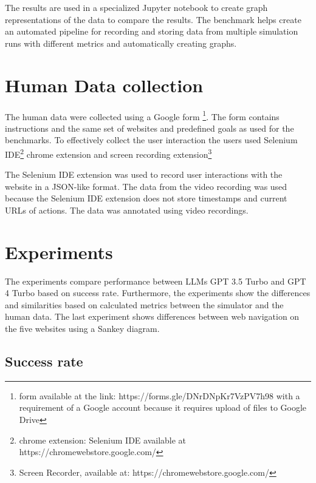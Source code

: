 The results are used in a specialized Jupyter notebook to create graph representations of the data to compare the results. The benchmark helps create an automated pipeline for recording and storing data from multiple simulation runs with different metrics and automatically creating graphs.

\section{Human Data collection}

The human data were collected using a Google form \footnote{form available at the link: https://forms.gle/DNrDNpKr7VzPV7h98 with a requirement of a Google account because it requires upload of files to Google Drive}. The form contains instructions and the same set of websites and predefined goals as used for the benchmarks. To effectively collect the user interaction the users used Selenium IDE\footnote{chrome extension: Selenium IDE available at https://chromewebstore.google.com/} chrome extension and screen recording extension\footnote{Screen Recorder, available at: https://chromewebstore.google.com/}

The Selenium IDE extension was used to record user interactions with the website in a JSON-like format. The data from the video recording was used because the Selenium IDE extension does not store timestamps and current URLs of actions. The data was annotated using video recordings.


\section{Experiments}

The experiments compare performance between LLMs GPT 3.5 Turbo and GPT 4 Turbo based on success rate. Furthermore, the experiments show the differences and similarities based on calculated metrics between the simulator and the human data. The last experiment shows differences between web navigation on the five websites using a Sankey diagram.

\subsection{Success rate}

